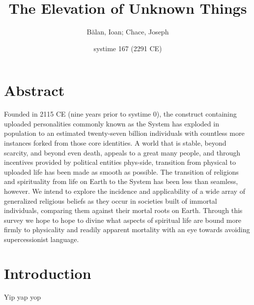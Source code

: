 \documentclass[11pt,oneside]{article}
\title{The Elevation of Unknown Things}
\author{Bălan, Ioan; Chace, Joseph}
\date{systime 167 (2291 CE)}
\begin{document}
\maketitle

\section*{Abstract}

Founded in 2115 CE (nine years prior to systime 0), the construct containing uploaded personalities commonly known as the System has exploded in population to an estimated twenty-seven billion individuals with countless more instances forked from those core identities. A world that is stable, beyond scarcity, and beyond even death, appeals to a great many people, and through incentives provided by political entities phys-side, transition from physical to uploaded life has been made as smooth as possible. The transition of religions and spirituality from life on Earth to the System has been less than seamless, however. We intend to explore the incidence and applicability of a wide array of generalized religious beliefs as they occur in societies built of immortal individuals, comparing them against their mortal roots on Earth. Through this survey we hope to hope to divine what aspects of spiritual life are bound more firmly to physicality and readily apparent mortality with an eye towards avoiding supercessionist language.

\newpage
\pagestyle{fancy}

\section{Introduction}

Yip yap yop
\end{document}
